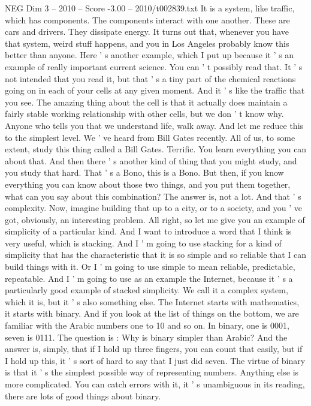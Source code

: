 \begin{textsample}{NEG Dim 3 – 2010 – Score -3.00 – 2010/t002839.txt}
It is a system, like traffic, which has components.
The components interact with one another.
These are cars and drivers.
They dissipate energy.
It turns out that, whenever you have that system, weird stuff happens, and you in Los Angeles probably know this better than anyone.
Here ' s another example, which I put up because it ' s an example of really important current science.
You can ' t possibly read that.
It ' s not intended that you read it, but that ' s a tiny part of the chemical reactions going on in each of your cells at any given moment.
And it ' s like the traffic that you see.
The amazing thing about the cell is that it actually does maintain a fairly stable working relationship with other cells, but we don ' t know why.
Anyone who tells you that we understand life, walk away.
And let me reduce this to the simplest level.
We ' ve heard from Bill Gates recently.
All of us, to some extent, study this thing called a Bill Gates.
Terrific.
You learn everything you can about that.
And then there ' s another kind of thing that you might study, and you study that hard.
That ' s a Bono, this is a Bono.
But then, if you know everything you can know about those two things, and you put them together, what can you say about this combination?
The answer is, not a lot.
And that ' s complexity.
Now, imagine building that up to a city, or to a society, and you ' ve got, obviously, an interesting problem.
All right, so let me give you an example of simplicity of a particular kind.
And I want to introduce a word that I think is very useful, which is stacking.
And I ' m going to use stacking for a kind of simplicity that has the characteristic that it is so simple and so reliable that I can build things with it.
Or I ' m going to use simple to mean reliable, predictable, repeatable.
And I ' m going to use as an example the Internet, because it ' s a particularly good example of stacked simplicity.
We call it a complex system, which it is, but it ' s also something else.
The Internet starts with mathematics, it starts with binary.
And if you look at the list of things on the bottom, we are familiar with the Arabic numbers one to 10 and so on.
In binary, one is 0001, seven is 0111.
The question is : Why is binary simpler than Arabic?
And the answer is, simply, that if I hold up three fingers, you can count that easily, but if I hold up this, it ' s sort of hard to say that I just did seven.
The virtue of binary is that it ' s the simplest possible way of representing numbers.
Anything else is more complicated.
You can catch errors with it, it ' s unambiguous in its reading, there are lots of good things about binary.

\end{textsample}
